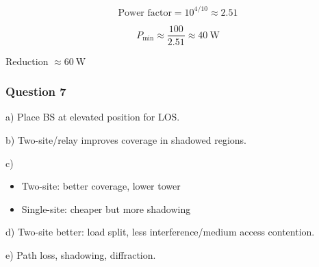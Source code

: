 \[
\text{Power factor} = 10^{4/10} \approx 2.51
\]

\[
P_{\min} \approx \frac{100}{2.51} \approx 40\ \mathrm{W}
\]

Reduction $\approx 60\ \mathrm{W}$

\vspace{0.3cm}

\subsubsection*{Question 7}

a) Place BS at elevated position for LOS.

b) Two-site/relay improves coverage in shadowed regions.

c)
\begin{itemize}
\item Two-site: better coverage, lower tower
\item Single-site: cheaper but more shadowing
\end{itemize}

d) Two-site better: load split, less interference/medium access contention.

e) Path loss, shadowing, diffraction.
